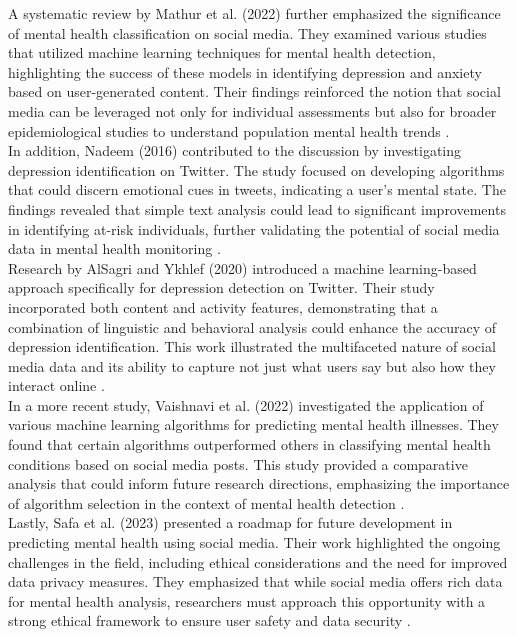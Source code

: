 \noindent
A systematic review by Mathur et al. (2022) further emphasized the significance of mental health classification on social media. They examined various studies that utilized machine learning techniques for mental health detection, highlighting the success of these models in identifying depression and anxiety based on user-generated content. Their findings reinforced the notion that social media can be leveraged not only for individual assessments but also for broader epidemiological studies to understand population mental health trends \cite{Mathur2022MentalHC}. \\

\noindent
In addition, Nadeem (2016) contributed to the discussion by investigating depression identification on Twitter. The study focused on developing algorithms that could discern emotional cues in tweets, indicating a user's mental state. The findings revealed that simple text analysis could lead to significant improvements in identifying at-risk individuals, further validating the potential of social media data in mental health monitoring \cite{nadeem2016identifying}. \\

\noindent
Research by AlSagri and Ykhlef (2020) introduced a machine learning-based approach specifically for depression detection on Twitter. Their study incorporated both content and activity features, demonstrating that a combination of linguistic and behavioral analysis could enhance the accuracy of depression identification. This work illustrated the multifaceted nature of social media data and its ability to capture not just what users say but also how they interact online \cite{alsagri2020machine}. \\

\noindent
In a more recent study, Vaishnavi et al. (2022) investigated the application of various machine learning algorithms for predicting mental health illnesses. They found that certain algorithms outperformed others in classifying mental health conditions based on social media posts. This study provided a comparative analysis that could inform future research directions, emphasizing the importance of algorithm selection in the context of mental health detection \cite{Vaishnavi_2022}. \\

\noindent
Lastly, Safa et al. (2023) presented a roadmap for future development in predicting mental health using social media. Their work highlighted the ongoing challenges in the field, including ethical considerations and the need for improved data privacy measures. They emphasized that while social media offers rich data for mental health analysis, researchers must approach this opportunity with a strong ethical framework to ensure user safety and data security \cite{safa2023predictingmentalhealthusing}. \\


